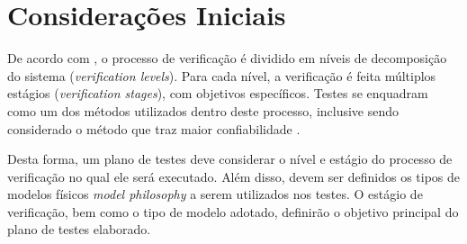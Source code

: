 
\section{Considerações Iniciais} \label{sec:consideracoes}

De acordo com \textcite{ecss-e-st-10-02}, o processo de verificação é dividido em níveis de decomposição do sistema (\textit{verification levels}). Para cada nível, a verificação é feita múltiplos estágios (\textit{verification stages}), com objetivos específicos.
Testes se enquadram como um dos métodos utilizados dentro deste processo, inclusive sendo considerado o método que traz maior confiabilidade \cite{ecss-e-st-10-02}.

Desta forma, um plano de testes deve considerar o nível e estágio do processo de verificação no qual ele será executado.
Além disso, devem ser definidos os tipos de modelos físicos \textit{model philosophy} a serem utilizados nos testes.
O estágio de verificação, bem como o tipo de modelo adotado, definirão o objetivo principal do plano de testes elaborado.

